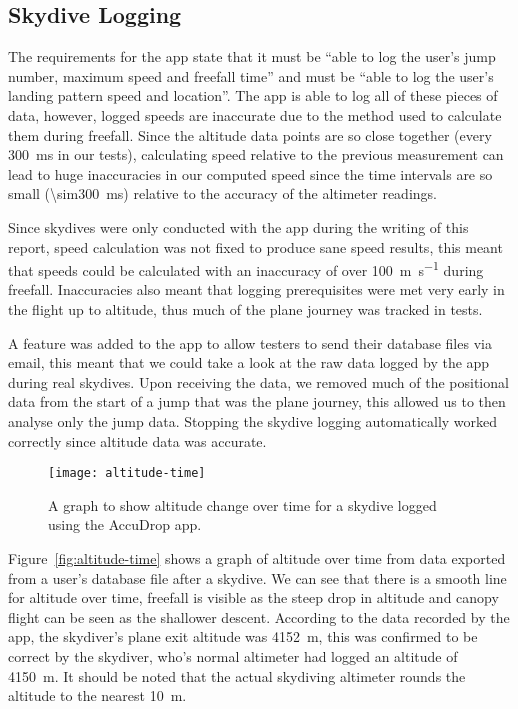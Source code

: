 \subsection{Skydive Logging}\label{subsec:skydive-logging}
The requirements for the app state that it must be ``able to log the user's jump number, maximum speed and freefall time'' and must be ``able to log the user's landing pattern speed and location''. The app is able to log all of these pieces of data, however, logged speeds are inaccurate due to the method used to calculate them during freefall. Since the altitude data points are so close together (every \SI{300}{\milli\second} in our tests), calculating speed relative to the previous measurement can lead to huge inaccuracies in our computed speed since the time intervals are so small (\SI{\sim300}{\milli\second}) relative to the accuracy of the altimeter readings.

Since skydives were only conducted with the app during the writing of this report, speed calculation was not fixed to produce sane speed results, this meant that speeds could be calculated with an inaccuracy of over \SI{100}{\metre\per\second} during freefall. Inaccuracies also meant that logging prerequisites were met very early in the flight up to altitude, thus much of the plane journey was tracked in tests.

A feature was added to the app to allow testers to send their database files via email, this meant that we could take a look at the raw data logged by the app during real skydives. Upon receiving the data, we removed much of the positional data from the start of a jump that was the plane journey, this allowed us to then analyse only the jump data. Stopping the skydive logging automatically worked correctly since altitude data was accurate.

\begin{figure}[ht]
  \centering
  \texttt{[image: altitude-time]}
  \caption{A graph to show altitude change over time for a skydive logged using the AccuDrop app.}\label{fig:altitude-time}
\end{figure}

Figure~\vref{fig:altitude-time} shows a graph of altitude over time from data exported from a user's database file after a skydive. We can see that there is a smooth line for altitude over time, freefall is visible as the steep drop in altitude and canopy flight can be seen as the shallower descent. According to the data recorded by the app, the skydiver's plane exit altitude was \SI{4152}{\metre}, this was confirmed to be correct by the skydiver, who's normal altimeter had logged an altitude of \SI{4150}{\metre}. It should be noted that the actual skydiving altimeter rounds the altitude to the nearest \SI{10}{\metre}.

